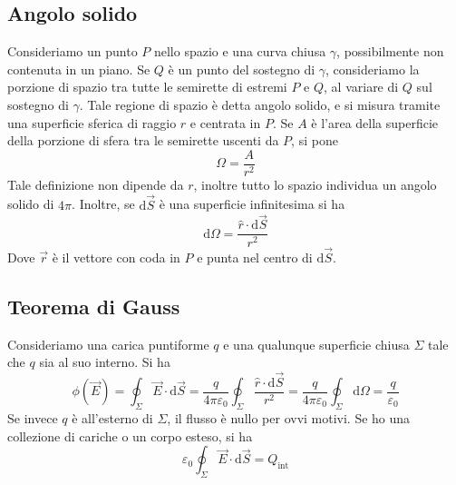 \documentclass[a4paper,11pt]{book}
\let\oldepsilon\epsilon
\let\oldvarepsilon\varepsilon
\renewcommand{\epsilon}{\oldvarepsilon}
\renewcommand{\varepsilon}{\oldepsilon}
\theoremstyle{definition}
\theoremstyle{theorem}
\begin{document}
		\subsection{Angolo solido}
		Consideriamo un punto $P$ nello spazio e una curva chiusa $\gamma$, possibilmente non contenuta in un piano. Se $Q$ è un punto del sostegno di $\gamma$, consideriamo la porzione di spazio tra tutte le semirette di estremi $P$ e $Q$, al variare di $Q$ sul sostegno di $\gamma$. Tale regione di spazio è detta angolo solido, e si misura tramite una superficie sferica di raggio $r$ e centrata in $P$. Se $A$ è l'area della superficie della porzione di sfera tra le semirette uscenti da $P$, si pone
		\[\Omega=\frac{A}{r^2}\]
		Tale definizione non dipende da $r$, inoltre tutto lo spazio individua un angolo solido di $4\pi$. Inoltre, se $\mathrm{d}\vec{S}$ è una superficie infinitesima si ha
		\[\mathrm{d}\Omega=\frac{\hat{r}\cdot\mathrm{d}\vec{S}}{r^2}\]
		Dove $\vec{r}$ è il vettore con coda in $P$ e punta nel centro di $\mathrm{d}\vec{S}$.
		\subsection{Teorema di Gauss}
		Consideriamo una carica puntiforme $q$ e una qualunque superficie chiusa $\Sigma$ tale che $q$ sia al suo interno. Si ha
		\[\phi(\vec{E})=\oint_{\Sigma}\vec{E}\cdot\mathrm{d}\vec{S}=\frac{q}{4\pi\epsilon_0}\oint_{\Sigma}\frac{\hat{r}\cdot\mathrm{d}\vec{S}}{r^2}=\frac{q}{4\pi\epsilon_0}\oint_{\Sigma}\mathrm{d}\Omega=\frac{q}{\epsilon_0}\]
		Se invece $q$ è all'esterno di $\Sigma$, il flusso è nullo per ovvi motivi. Se ho una collezione di cariche o un corpo esteso, si ha
		\[\epsilon_0\oint_{\Sigma}\vec{E}\cdot\mathrm{d}\vec{S}=Q_{\textrm{int}}\]
\end{document}
